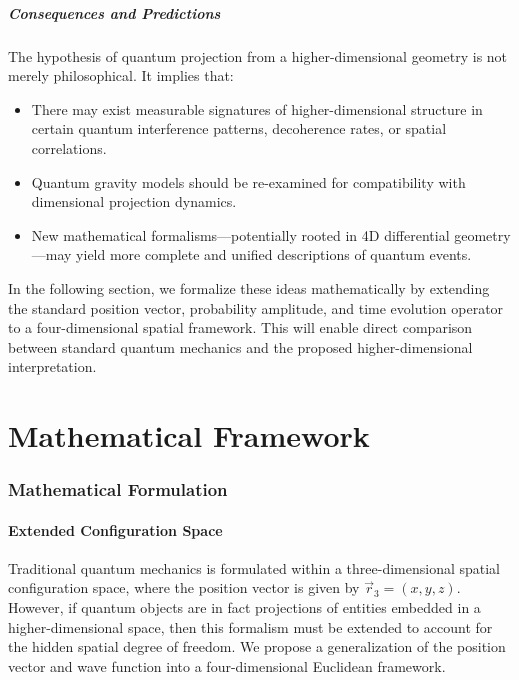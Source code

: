 \documentclass[12pt]{article}
\begin{document}
\subsubsection{Consequences and Predictions}

The hypothesis of quantum projection from a higher-dimensional geometry is not merely philosophical. It implies that:

\begin{itemize}
    \item There may exist measurable signatures of higher-dimensional structure in certain quantum interference patterns, decoherence rates, or spatial correlations.
    \item Quantum gravity models should be re-examined for compatibility with dimensional projection dynamics.
    \item New mathematical formalisms—potentially rooted in 4D differential geometry—may yield more complete and unified descriptions of quantum events.
\end{itemize}

In the following section, we formalize these ideas mathematically by extending the standard position vector, probability amplitude, and time evolution operator to a four-dimensional spatial framework. This will enable direct comparison between standard quantum mechanics and the proposed higher-dimensional interpretation.



\part{Mathematical Framework}

\section{Mathematical Formulation}

\subsection{Extended Configuration Space}

Traditional quantum mechanics is formulated within a three-dimensional spatial configuration space, where the position vector is given by $\vec{r}_3 = (x, y, z)$. However, if quantum objects are in fact projections of entities embedded in a higher-dimensional space, then this formalism must be extended to account for the hidden spatial degree of freedom. We propose a generalization of the position vector and wave function into a four-dimensional Euclidean framework.
\end{document}
